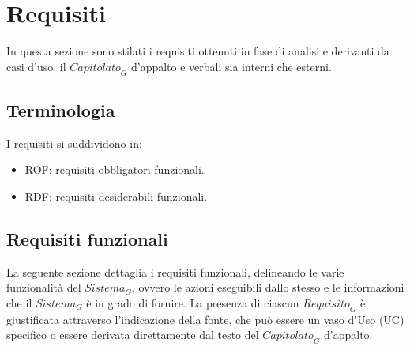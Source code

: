 \documentclass[12pt, oneside]{article}
\begin{document}














\newpage











%
%

%

%

\section{Requisiti}
In questa sezione sono stilati i requisiti ottenuti in fase di analisi e derivanti da casi d'uso, il $\textit{Capitolato}_G$ d'appalto e verbali sia interni che esterni. 
\subsection{Terminologia}
I requisiti si suddividono in:
\begin{itemize}
    \item ROF: requisiti obbligatori funzionali.
    \item RDF: requisiti desiderabili funzionali.
\end{itemize}
\subsection{Requisiti funzionali}
La seguente sezione dettaglia i requisiti funzionali, delineando le varie funzionalità del $\textit{Sistema}_G$, ovvero le azioni eseguibili dallo stesso e le informazioni che il $\textit{Sistema}_G$ è in grado di fornire. La presenza di ciascun $\textit{Requisito}_G$ è giustificata attraverso l'indicazione della fonte, che può essere un vaso d'Uso (UC) specifico o essere derivata direttamente dal testo del $\textit{Capitolato}_G$ d'appalto.
\end{document}

